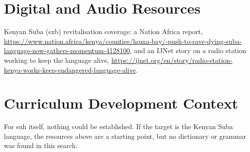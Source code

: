 \documentclass[12pt]{article}
\begin{document}
\section{Digital and Audio Resources}
Kenyan Suba (sxb) revitalisation coverage: a Nation Africa report, \url{https://www.nation.africa/kenya/counties/homa-bay/-push-to-save-dying-suba-language-now-gathers-momentum-4128100}, and an IJNet story on a radio station working to keep the language alive, \url{https://ijnet.org/en/story/radio-station-kenya-works-keep-endangered-language-alive}.

\section{Curriculum Development Context}
For suh itself, nothing could be established. If the target is the Kenyan Suba language, the resources above are a starting point, but no dictionary or grammar was found in this search.
\end{document}
